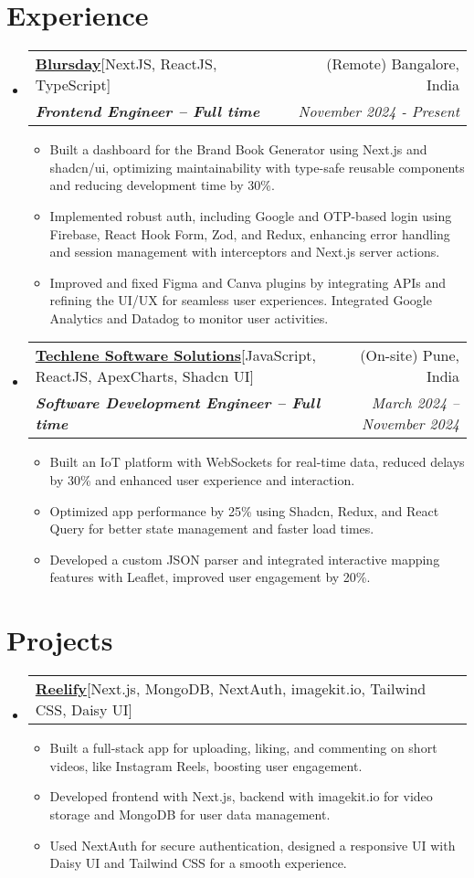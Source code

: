 \documentclass[letterpaper,10pt]{article}
\makeatletter
\newcommand{\resumeItem}[1]{
    \item\small{
      {#1 \vspace{-2pt}}
    }
  }
\newcommand{\resumeSubheading}[4]{
    \vspace{-2pt}\item
      \begin{tabular*}{0.97\textwidth}[t]{l@{\extracolsep{\fill}}r}
        {#1} & #2 \\
        \textit{\small#3} & \textit{\small #4}\\
      \end{tabular*}\vspace{-7pt}
  }
\newcommand{\resumeProjectHeading}[2]{
      \item
      \begin{tabular*}{0.97\textwidth}{l@{\extracolsep{\fill}}r}
        \small#1 & #2 \\
      \end{tabular*}\vspace{-7pt}
  }
\newcommand{\resumeSubHeadingListStart}{\begin{itemize}[leftmargin=0.15in, label={}]}
\newcommand{\resumeSubHeadingListEnd}{\end{itemize}}
\newcommand{\resumeItemListStart}{\begin{itemize}}
\newcommand{\resumeItemListEnd}{\end{itemize}\vspace{-5pt}}
\makeatother
\begin{document}

\section{Experience}

\resumeSubHeadingListStart
\resumeSubheading
{\textbf{\href{https://www.blursday.ai/}{Blursday}\hspace{5pt}}{{[NextJS, ReactJS, TypeScript]}}}{(Remote) Bangalore, India}
{\textbf{Frontend Engineer – Full time}}{November 2024 - Present }
\resumeItemListStart
\resumeItem{Built a dashboard for the Brand Book Generator using Next.js and shadcn/ui, optimizing maintainability with type-safe reusable components and reducing development time by 30\%.
}
\resumeItem{Implemented robust auth, including Google and OTP-based login using Firebase, React Hook Form, Zod, and Redux, enhancing error handling and session management with interceptors and Next.js server actions.
}
\resumeItem{Improved and fixed Figma and Canva plugins by integrating APIs and refining the UI/UX for seamless user experiences. Integrated Google Analytics and Datadog to monitor user activities.}
\resumeItemListEnd
\resumeSubHeadingListEnd


\resumeSubHeadingListStart
\resumeSubheading
  {\textbf{\href{https://www.techlene.com/}{Techlene Software Solutions}\hspace{5pt}}{[JavaScript, ReactJS, ApexCharts, Shadcn UI]}}{(On-site) Pune, India}
  {\textbf{Software Development Engineer – Full time}}{March 2024 -- November 2024}
  \resumeItemListStart
    \resumeItem{Built an IoT platform with WebSockets for real-time data, reduced delays by 30\% and enhanced user experience and interaction.}
    \resumeItem{Optimized app performance by 25\% using Shadcn, Redux, and React Query for better state management and faster load times.}
    \resumeItem{Developed a custom JSON parser and integrated interactive mapping features with Leaflet, improved user engagement by 20\%.}
  \resumeItemListEnd
\resumeSubHeadingListEnd





\section{Projects}

\resumeSubHeadingListStart
\resumeProjectHeading
{\textbf{\href{https://github.com/shanutiwari1010/reelify}
{Reelify}\hspace{5pt}}{{[Next.js, MongoDB, NextAuth, imagekit.io, Tailwind CSS, Daisy UI]}}}{}
\resumeItemListStart
\resumeItem{Built a full-stack app for uploading, liking, and commenting on short videos, like Instagram Reels, boosting user engagement.}
\resumeItem{Developed frontend with Next.js, backend with imagekit.io for video storage and MongoDB for user data management.}
\resumeItem{Used NextAuth for secure authentication, designed a responsive UI with Daisy UI and Tailwind CSS for a smooth experience.}
\resumeItemListEnd
\resumeSubHeadingListEnd
\end{document}
